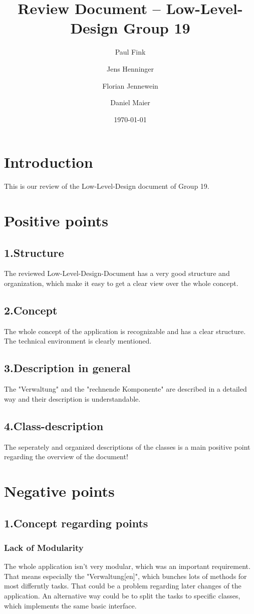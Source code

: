 \documentclass{article}
\title{Review Document -- Low-Level-Design Group 19 }
\author{Paul Fink \and Jens Henninger \and Florian Jennewein \and Daniel Maier}
\date{\today}
\begin{document}
\maketitle

\section{Introduction}
This is our review of the Low-Level-Design document of Group 19. 
\section{Positive points}
\subsection{1.Structure}
The reviewed Low-Level-Design-Document has a very good structure and organization, which make it easy to get a clear view over the whole concept. 
\subsection{2.Concept}
The whole concept of the application is recognizable and has a clear structure.
The technical environment is clearly mentioned.
\subsection{3.Description in general}
The "Verwaltung" and the "rechnende Komponente" are described in a detailed way and their description is understandable.
\subsection{4.Class-description} 
The seperately and organized descriptions of the classes is a main positive point regarding the overview of the document!
\section{Negative points}
\subsection{1.Concept regarding points}
\subsubsection{Lack of Modularity}
The whole application isn't very modular, which was an important requirement. That means especially the "Verwaltung[en]", which bunches lots of methods for most differntly tasks. That could be a problem regarding later changes of the application. An alternative way could be to split the tasks to specific classes, which implements the same basic interface.
\end{document}
